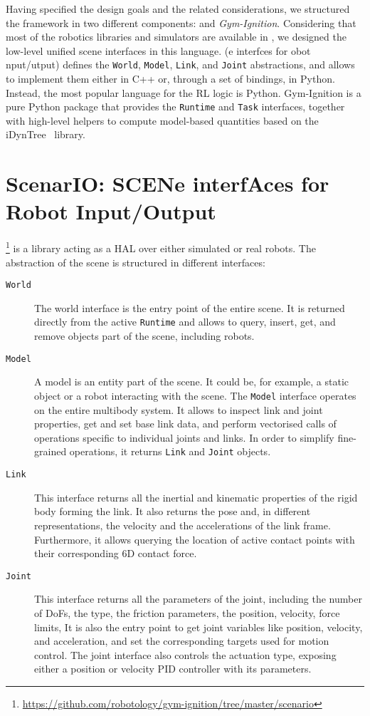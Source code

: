 Having specified the design goals and the related considerations, we structured the framework in two different components: \emph{\scenario} and \emph{Gym-Ignition}.
Considering that most of the robotics libraries and simulators are available in \cpp, we designed the low-level unified scene interfaces in this language.
\scenario (e interfces for obot nput/utput) defines the \verb|World|, \verb|Model|, \verb|Link|, and \verb|Joint| abstractions, and allows to implement them either in C++ or, through a set of bindings, in Python.
Instead, the most popular language for the \ac{RL} logic is Python.
Gym-Ignition is a pure Python package that provides the \verb|Runtime| and \verb|Task| interfaces, together with high-level helpers to compute model-based quantities based on the iDynTree~\parencite{nori_icub_2015} library.

\section{ScenarIO: SCENe interfAces for Robot Input/Output}

\scenario\footnote{\url{https://github.com/robotology/gym-ignition/tree/master/scenario}} is a \cpp library acting as a \ac{HAL} over either simulated or real robots.
The abstraction of the scene is structured in different interfaces:
%
\begin{description}
%
\item[\texttt{\MakeUppercase{W}orld}]
The world interface is the entry point of the entire scene.
It is returned directly from the active \verb|Runtime| and allows to query, insert, get, and remove objects part of the scene, including robots.
%
\item[\texttt{\MakeUppercase{M}odel}]
A model is an entity part of the scene.
It could be, for example, a static object or a robot interacting with the scene.
The \verb|Model| interface operates on the entire multibody system.
It allows to inspect link and joint properties, get and set base link data, and perform vectorised calls of operations specific to individual joints and links.
In order to simplify fine-grained operations, it returns \verb|Link| and \verb|Joint| objects.
%
\item[\texttt{\MakeUppercase{L}ink}]
This interface returns all the inertial and kinematic properties of the rigid body forming the link.
It also returns the pose and, in different representations, the velocity and the accelerations of the link frame.
Furthermore, it allows querying the location of active contact points with their corresponding 6D contact force.
%
\item[\texttt{\MakeUppercase{J}oint}]
This interface returns all the parameters of the joint, including the number of \acp{DoF}, the type, the friction parameters, the position, velocity, force limits, \etc It is also the entry point to get joint variables like position, velocity, and acceleration, and set the corresponding targets used for motion control.
The joint interface also controls the actuation type, exposing either a position or velocity PID controller with its parameters.
%
\end{description}

